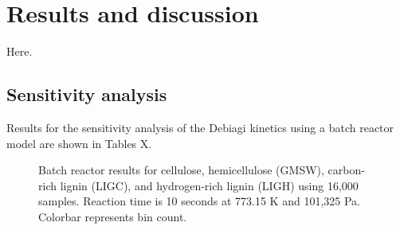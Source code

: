 
\section{Results and discussion}

Here.

\subsection{Sensitivity analysis}

Results for the sensitivity analysis of the Debiagi kinetics using a batch reactor model are shown in Tables X.

\begin{figure}[H]
    \centering
    \caption{Batch reactor results for cellulose, hemicellulose (GMSW), carbon-rich lignin (LIGC), and hydrogen-rich lignin (LIGH) using 16,000 samples. Reaction time is 10 seconds at 773.15 K and 101,325 Pa. Colorbar represents bin count.}
\end{figure}

